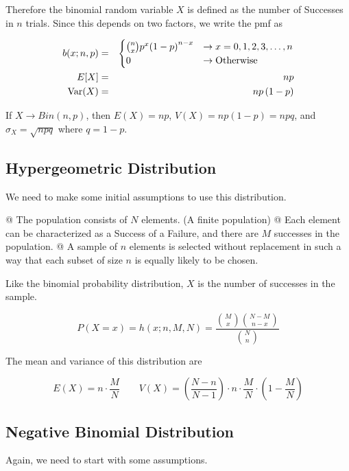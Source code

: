     Therefore the binomial random variable $X$ is defined as the number of Successes in $n$ trials. Since this depends
    on two factors, we write the pmf as

        \[
            \begin{aligned}
                b(x;n, p) &=& \begin{cases}
                                \binom{n}{x} p^x {(1 - p)}^{n - x} &\to x = 0, 1, 2, 3, \ldots, n\\
                                0 &\to \text{Otherwise}
                            \end{cases}\\
                E[X] &=& np\\
                \text{Var}(X) &=& np\left( 1 - p \right)
            \end{aligned}
        \]

    If $X \to Bin(n, p)$, then $E(X) = np$, $V(X) = np(1 - p) = npq$, and $\sigma_X = \sqrt{npq}$ where $q = 1 - p$.

    \subsection{Hypergeometric Distribution}
    We need to make some initial assumptions to use this distribution.

        \NewList
        \begin{easylist}
            @ The population consists of $N$ elements. (A finite population)
            @ Each element can be characterized as a Success of a Failure, and there are $M$ successes in the
            population.
            @ A sample of $n$ elements is selected without replacement in such a way that each subset of size $n$ is
            equally likely to be chosen.
        \end{easylist}

    Like the binomial probability distribution, $X$ is the number of successes in the sample.

        \[ P(X=x) = h(x;n, M, N) = \frac{\binom{M}{x} \binom{N-M}{n-x} }{\binom{N}{n} } \]

    The mean and variance of this distribution are

        \[
            E(X) = n \cdot \frac{M}{N}\qquad
            V(X) = \left( \frac{N-n}{N-1} \right) \cdot n \cdot \frac{M}{N} \cdot \left( 1 - \frac{M}{N} \right)
        \]

    \subsection{Negative Binomial Distribution}
    Again, we need to start with some assumptions.

